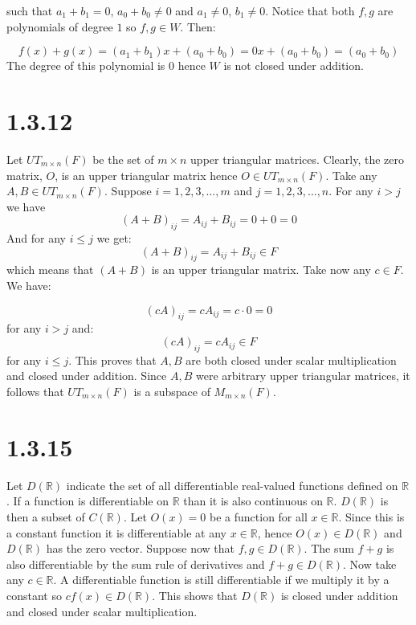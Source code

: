 \documentclass{article}
\begin{document}
such that \(a_{1} + b_{1} = 0\), \(a_{0} + b_{0} \neq 0\) and \(a_{1} \neq 0\), \(b_{1} \neq 0\). Notice that both \(f, g\) are polynomials
of degree \(1\) so \(f, g \in W\). Then:

\begin{equation*}
    f(x) + g(x) = (a_{1} + b_{1})x + (a_{0} + b_{0}) = 0x + (a_{0} + b_{0}) = (a_{0} + b_{0})
\end{equation*}
The degree of this polynomial is \(0\) hence \(W\) is not closed under addition.

\section*{1.3.12}

Let \(UT_{m \times n}(F)\) be the set of \(m \times n\) upper triangular matrices.
Clearly, the zero matrix, \(O\), is an upper triangular matrix hence \(O \in UT_{m \times n}(F)\). 
Take any \(A, B \in UT_{m \times n}(F)\). Suppose \(i = 1, 2, 3, \dots, m\) and \(j = 1, 2, 3, \dots, n\).
For any \(i > j\) we have
\begin{equation*}
    (A + B)_{ij} = A_{ij} + B_{ij} = 0 + 0 = 0
\end{equation*}
And for any \(i \leq j\) we get:
\begin{equation*}
    (A + B)_{ij} = A_{ij} + B_{ij} \in F
\end{equation*}
which means that \((A + B)\) is an upper triangular matrix. Take now any \(c \in F\). We have:

\begin{equation*}
    (cA)_{ij} = cA_{ij} = c \cdot 0 = 0
\end{equation*}
for any \(i > j\) and:
\begin{equation*}
    (cA)_{ij} = cA_{ij} \in F
\end{equation*}
for any \(i \leq j\). This proves that \(A, B\) are both closed under scalar multiplication and closed under addition. Since \(A, B\)
were arbitrary upper triangular matrices, it follows that \(UT_{m \times n}(F)\) is a subspace of \(M_{m \times n}(F)\).

\section*{1.3.15}
Let \(D(\mathbb{R})\) indicate the set of all differentiable real-valued functions defined on \(\mathbb{R}\).
If a function is differentiable on \(\mathbb{R}\) than it is also continuous on \(\mathbb{R}\). \(D(\mathbb{R})\) is
then a subset of \(C(\mathbb{R})\). Let \(O(x) = 0\) be a function for all \(x \in \mathbb{R}\). Since this is a constant function it is
differentiable at any \(x \in \mathbb{R}\), hence \(O(x) \in D(\mathbb{R})\) and \(D(\mathbb{R})\) has the zero vector.
Suppose now that \(f, g \in D(\mathbb{R})\). The sum \(f + g\)
is also differentiable by the sum rule of derivatives and \(f + g \in D(\mathbb{R})\). Now take any \(c \in \mathbb{R}\).
A differentiable function is still differentiable if we multiply it by a constant so \(cf(x) \in D(\mathbb{R})\).
This shows that \(D(\mathbb{R})\) is closed under addition and closed under scalar multiplication.
\end{document}
